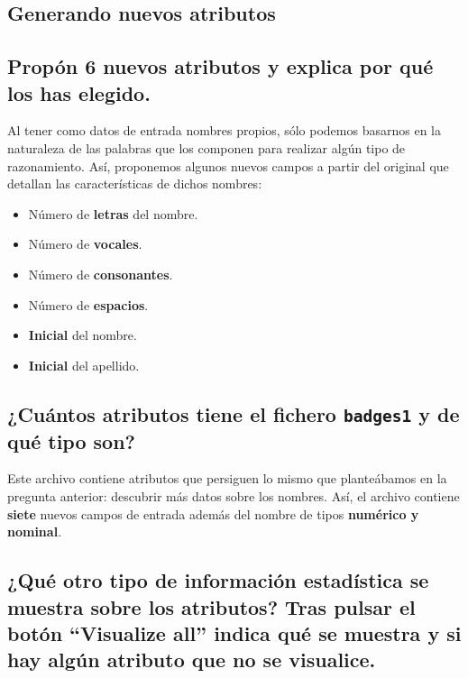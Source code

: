 \documentclass[12pt]{article}
\begin{document}
\newpage

\begin{center}
\section{Generando nuevos atributos}
\end{center}

\subsection*{\small Propón 6 nuevos atributos y explica por qué los has elegido.}

Al tener como datos de entrada nombres propios, sólo podemos basarnos en la naturaleza de las palabras que los componen para realizar algún tipo de razonamiento. Así, proponemos algunos nuevos campos a partir del original que detallan las características de dichos nombres:

\begin{itemize}
    \item Número de \textbf{letras} del nombre.
    \item Número de \textbf{vocales}.
    \item Número de \textbf{consonantes}.
    \item Número de \textbf{espacios}.
    \item \textbf{Inicial} del nombre.
    \item \textbf{Inicial} del apellido.
\end{itemize}

\subsection*{\small ¿Cuántos atributos tiene el fichero \texttt{badges1} y de qué tipo son?}

Este archivo contiene atributos que persiguen lo mismo que planteábamos en la pregunta anterior: descubrir más datos sobre los nombres. Así, el archivo contiene \textbf{siete} nuevos campos de entrada además del nombre de tipos \textbf{numérico y nominal}.

\subsection*{\small ¿Qué otro tipo de información estadística se muestra sobre los atributos? Tras pulsar el botón ``Visualize all'' indica qué se muestra y si hay algún atributo que no se visualice.}
\end{document}
